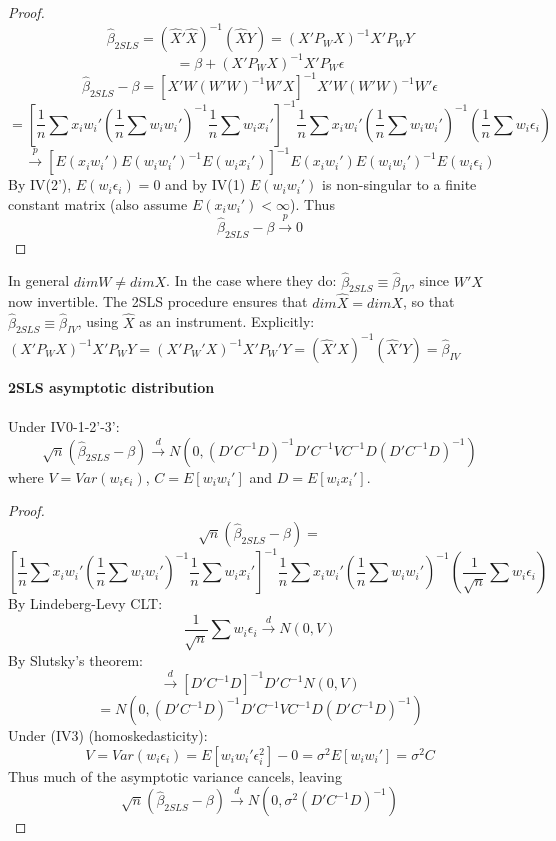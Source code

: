 \documentclass[DIV=14,titlepage=false]{scrreprt}
\begin{document}
\vspace{5mm}
\begin{proof}
\[\hat{\beta}_{2SLS}=(\hat X'\hat X)^{-1}(\hat X Y)=(X'P_WX)^{-1}X'P_WY\]
\[=\beta+(X'P_WX)^{-1}X'P_W\epsilon\]
\[\hat{\beta}_{2SLS}-\beta=[X'W (W'W)^{-1}W'X]^{-1}X'W(W'W)^{-1}W'\epsilon\]
\[=\left[\frac{1}{n}\sum x_iw_i'(\frac{1}{n}\sum w_iw_i')^{-1}\frac{1}{n}\sum w_ix_i'\right]^{-1}\frac{1}{n}\sum x_iw_i'(\frac{1}{n}\sum w_iw_i')^{-1}(\frac{1}{n}\sum w_i\epsilon_i)\]
\[\xrightarrow{p} [E(x_iw_i')E(w_iw_i')^{-1}E(w_ix_i')]^{-1}E(x_iw_i')E(w_iw_i')^{-1}E(w_i\epsilon_i)\]
By IV(2'), \(E(w_i\epsilon_i)=0\) and by IV(1) \(E(w_iw_i')\) is non-singular to a finite constant matrix (also assume \(E(x_iw_i') <\infty\)).
Thus \[\hat\beta_{2SLS}-\beta\xrightarrow{p}0\]
\end{proof}

In general \(dim W\neq dim X\). In the case where they do: \(\hat\beta_{2SLS}\equiv\hat\beta_{IV}\), since \(W'X\) now invertible.
The 2SLS procedure ensures that \(dim \hat X=dimX\), so that \(\hat\beta_{2SLS}\equiv\hat\beta_{IV}\), using \(\hat X\) as an instrument.
Explicitly: \((X'P_WX)^{-1}X'P_WY=(X'P_W'X)^{-1}X'P_W'Y=(\hat X'X)^{-1}(\hat X'Y)=\hat\beta_{IV}\)
\\
\begin{theorem} \textbf{2SLS asymptotic distribution} \\ \\
    Under IV0-1-2'-3':
    \[\sqrt{n}(\hat\beta_{2SLS}-\beta)\xrightarrow{d}N(0,(D'C^{-1}D)^{-1}D'C^{-1}VC^{-1}D(D'C^{-1}D)^{-1})\]
    where \(V=Var(w_i\epsilon_i)\), \(C=E[w_iw_i']\) and \(D=E[w_ix_i']\). 
\end{theorem}
\vspace{5mm}
\begin{proof}
\[\sqrt{n}(\hat\beta_{2SLS}-\beta)=\]
\[\left[\frac{1}{n}\sum x_iw_i'(\frac{1}{n}\sum w_iw_i')^{-1}\frac{1}{n}\sum w_ix_i'\right]^{-1}\frac{1}{n}\sum x_iw_i'(\frac{1}{n}\sum w_iw_i')^{-1}(\frac{1}{\sqrt{n}}\sum w_i\epsilon_i)\]
By Lindeberg-Levy CLT:
\[\frac{1}{\sqrt{n}}\sum w_i\epsilon_i\xrightarrow{d}N(0,V)\]
By Slutsky's theorem:
\[\xrightarrow{d} [D'C^{-1}D]^{-1}D'C^{-1}N(0,V)\]
\[= N(0,(D'C^{-1}D)^{-1}D'C^{-1}VC^{-1}D(D'C^{-1}D)^{-1})\]
Under (IV3) (homoskedasticity):
\[V=Var(w_i\epsilon_i)=E[w_iw_i'\epsilon_i^2]-0=\sigma^2E[w_iw_i']=\sigma^2C\]
Thus much of the asymptotic variance cancels, leaving
\[\sqrt{n}(\hat\beta_{2SLS}-\beta)\xrightarrow{d}N(0,\sigma^2(D'C^{-1}D)^{-1})\]
\end{proof}
\end{document}
